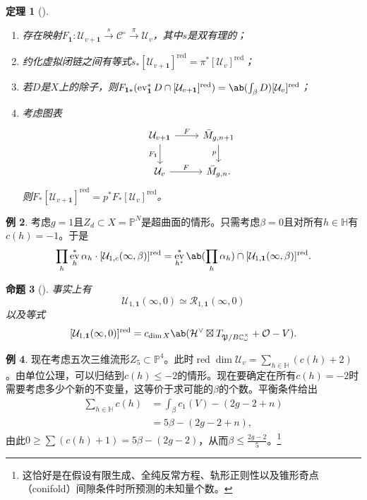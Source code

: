 \documentclass{amsart}
\newtheorem{thm}{定理}[section]
\newtheorem{prop}[thm]{命题}
\theoremstyle{definition}
\newtheorem{exm}[thm]{例}
\theoremstyle{remark}
\theoremstyle{plain}
\theoremstyle{definition}
\theoremstyle{remark}
\newcommand{\C}{\mathbb{C}}
\renewcommand{\H}{\mathbb{H}}
\renewcommand{\P}{\mathbb{P}}
\newcommand{\mc}[1]{\mathcal{#1}}
\newcommand{\mf}[1]{\mathfrak{#1}}
\newcommand{\mr}[1]{\mathrm{#1}}
\newcommand{\on}[1]{\operatorname{#1}}
\newcommand{\1}{\mathbf{1}}
\newcommand{\2}{\mathbf{2}}
\newcommand{\3}{\mathbf{3}}
\DeclareMathOperator{\ev}{ev}
\begin{document}
\begin{thm}[{\cite[定理~1.16--1.17]{CJRpunctured}}]\leavevmode
    \begin{enumerate}
        \item 存在映射\(F_{\1} \colon \mc{U}_{v+\1} \xrightarrow{s} \mc{C}^{\circ} \xrightarrow{\pi} \mc{U}_v\)，其中\(s\)是双有理的；
        \item 约化虚拟闭链之间有等式\(s_* [\mc{U}_{v+\1}]^{\on{red}} = \pi^* [\mc{U}_v]^{\on{red}}\)；
        \item 若\(D\)是\(X\)上的除子，则\(F_{\1 *} (\ev_{\1}^* D \cap [\mc{U}_{v+\1}]^{\on{red}}) = \ab(\int_{\beta} D) [\mc{U}_v]^{\on{red}}\)；
        \item 考虑图表
            \begin{equation*}
            \begin{tikzcd}
                \mc{U}_{v+\1} \ar{r}{F} \ar{d}[swap]{F_{\1}} & \bar{M}_{g,n+1} \ar{d}[swap]{p} \\
                \mc{U}_v \ar{r}{F} & \bar{M}_{g,n}.
            \end{tikzcd}
            \end{equation*}
            则\(F_* [\mc{U}_{v+\1}]^{\on{red}} = p^* F_* [\mc{U}_v]^{\on{red}}\)。
    \end{enumerate}
\end{thm}

\begin{exm}
    考虑\(g = 1\)且\(Z_d \subset X = \P^N\)是超曲面的情形。只需考虑\(\beta = 0\)且对所有\(h \in \H\)有\(c(h) = -1\)。于是
    \[ \prod_h \ev_h^* \alpha_h \cdot [\mc{U}_{1,c}(\infty,\beta)]^{\mr{red}} = \ev_{h^{\star}}^* \ab(\prod_h \alpha_h) \cap [\mc{U}_{1,\1}(\infty,\beta)]^{\on{red}}. \]
\end{exm}

\begin{prop}[{\cite{CJRpunctured}}]
    事实上有
    \[ \mc{U}_{1,\1}(\infty, 0) \simeq \mc{R}_{1,\1}(\infty, 0) \]
    以及等式
    \[ [\mc{U}_{1,\1}(\infty, 0)]^{\on{red}} = c_{\dim X} \ab(\mc{H}^{\vee} \boxtimes T_{\mf{P}/B\C_{\omega}^{\times}} + \mc{O} - V). \]
\end{prop}

\begin{exm}
    现在考虑五次三维流形\(Z_5 \subset \P^4\)。此时\(\on{red}\dim \mc{U}_v = \sum_{h \in \H} (c(h)+2)\)。由单位公理，可以归结到\(c(h) \leq -2\)的情形。现在要确定在所有\(c(h) = -2\)时需要考虑多少个新的不变量，这等价于求可能的\(\beta\)的个数。平衡条件给出
    \begin{align*}
        \sum_{h \in \H} c(h) &= \int_{\beta} c_1(V) - (2g-2+n) \\
        &= 5\beta - (2g-2+n),
    \end{align*}
    由此\(0 \geq \sum (c(h)+1) = 5\beta - (2g-2)\)，从而\(\beta \leq \frac{2g-2}{5}\)。\footnote{这恰好是在假设有限生成、全纯反常方程、轨形正则性以及锥形奇点（conifold）间隙条件时所预测的未知量个数。}
\end{exm}
\end{document}
